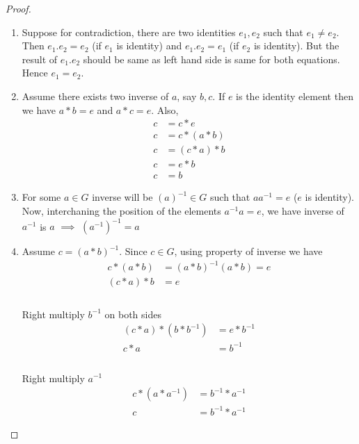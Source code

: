 \documentclass[12pt]{report}
\begin{document}
\begin{proof}
    \begin{enumerate}
        \item Suppose for contradiction, there are two identities $e_1,e_2$ such that $e_1 \neq e_2$. Then $e_1 . e_2 = e_2$ (if $e_1$ is identity) and $e_1 . e_2 = e_1$ (if $e_2$ is identity). But the result of $e_1 . e_2$ should be same as left hand side is same for both equations. Hence $e_1 = e_2$.
        \item Assume there exists two inverse of $a$, say $b,c$. If $e$ is the identity element then we have $a * b = e$ and $a * c = e$. Also, 
        \begin{align*}
            c &= c * e\\
            c &= c * (a*b)\\
            c &= (c*a) *b\\
            c &= e * b\\
            c &= b
        \end{align*}
        \item For some $a \in G$ inverse will be $(a)^{-1} \in G$ such that $aa^{-1} = e$ ($e$ is identity). Now, interchaning the position of the elements $a^{-1}a = e$, we have inverse of $a^{-1}$ is $a$ $\implies$ $(a^{-1})^{-1} = a$
        \item Assume $c = (a * b)^{-1}$. Since $c \in G$, using property of inverse we have
        \begin{align*}
            c * (a * b) &= (a * b)^{-1} (a * b) = e\\
            (c * a) * b &= e \\
        \end{align*} \vspace*{-40pt}\\
        Right multiply $b^{-1}$ on both sides
        \begin{align*}
            (c * a) * (b * b^{-1}) &= e * b^{-1}\\
            c * a &= b^{-1}\\            
        \end{align*} \vspace*{-40pt}\\
        Right multiply $a^{-1}$
        \begin{align*}
            c * (a * a^{-1}) &= b^{-1} * a^{-1}\\
            c &= b^{-1} * a^{-1}
        \end{align*}
    \end{enumerate}
\end{proof}
\end{document}
